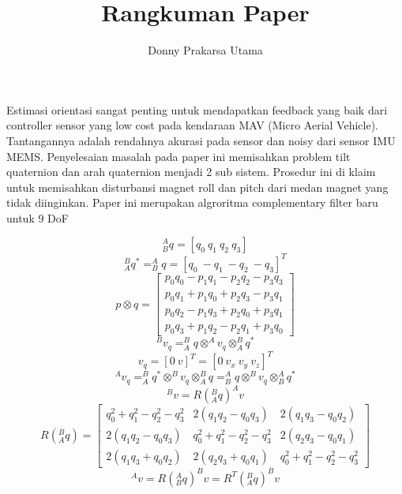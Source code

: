 \documentclass{article}
\begin{document}
\title{Rangkuman Paper}
\author{Donny Prakarsa Utama}
\maketitle

\cite{Valenti2015} Estimasi orientasi sangat penting untuk mendapatkan feedback yang baik dari controller sensor yang low 
cost pada kendaraan MAV (Micro Aerial Vehicle). 
Tantangannya adalah rendahnya akurasi pada sensor dan 
noisy dari sensor IMU MEMS. Penyelesaian masalah pada paper ini memisahkan problem tilt quaternion dan arah quaternion menjadi 2 sub sistem. Prosedur ini di klaim untuk memisahkan disturbansi magnet roll dan pitch dari medan magnet yang tidak diinginkan. Paper ini merupakan algroritma complementary filter baru untuk 9 DoF

\begin{equation}
^A_B q = [ q_0 ~ q_1~  q_2~  q_3 ]
\end{equation}
\begin{equation}
    ^B_A q^* = ^A_Bq = [ q_0~ -q_1~ -q_2~ -q_3 ]^T
\end{equation}
\begin{equation}
p\otimes q=\left[\begin{matrix}p_0q_0-p_1q_1-p_2q_2-p_3q_3\\p_0q_1+p_1q_0+p_2q_3-p_3q_1\\p_0q_2-p_1q_3+p_2q_0+p_3q_1\\p_0q_3+p_1q_2-p_2q_1+p_3q_0\end{matrix}\right]
\end{equation}
\begin{equation}
    ^Bv_q=^B_A q \otimes ^Av_q \otimes ^B_Aq^*
\end{equation}
\begin{equation}
    v_q = [0 ~ v]^T = [0 ~ v_x ~v_y~v_z]^T
\end{equation}
\begin{equation}
    ^Av_q=^B_Aq^* \otimes ^Bv_q \otimes ^B_Aq = ^A_Bq \otimes ^Bv_q \otimes ^A_Bq^* 
\end{equation}
\begin{equation}
    ^Bv=R(^B_Aq)^Av
\end{equation}
\begin{equation}
    R(^B_Aq)=\left[ 
        \begin{matrix}
            q_0^2+q_1^2-q_2^2-q_3^2 &2(q_1q_2-q_0q_3)&2(q_1q_3-q_0q_2)\\
            2(q_1q_2-q_0q_3)&q_0^2+q_1^2-q_2^2-q_3^2&2(q_2q_3-q_0q_1) \\
            2(q_1q_3+q_0q_2)& 2(q_2q_3+q_0q_1) &q_0^2+q_1^2-q_2^2-q_3^2
        \end{matrix}
    \right]
\end{equation}
\begin{equation}
    ^Av=R(^A_Bq)^Bv=R^T(^B_Aq)^Bv
\end{equation}
\end{document}
